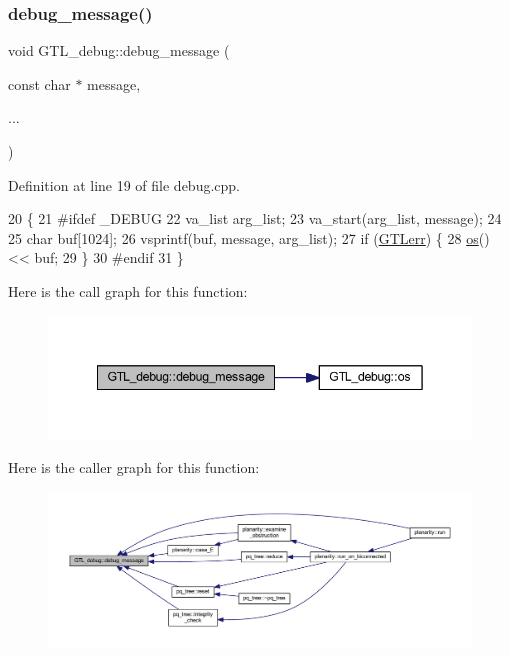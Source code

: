 \subsubsection{\texorpdfstring{debug\+\_\+message()}{debug\_message()}}
{\footnotesize\ttfamily void G\+T\+L\+\_\+debug\+::debug\+\_\+message (\begin{DoxyParamCaption}\item[{const char $\ast$}]{message,  }\item[{}]{... }\end{DoxyParamCaption})\hspace{0.3cm}{\ttfamily [static]}}



Definition at line 19 of file debug.\+cpp.


\begin{DoxyCode}
20 \{
21 \textcolor{preprocessor}{#ifdef \_DEBUG}
22     va\_list arg\_list;
23     va\_start(arg\_list, message);
24 
25     \textcolor{keywordtype}{char} buf[1024];
26     vsprintf(buf, message, arg\_list);
27     \textcolor{keywordflow}{if} (\mbox{\hyperlink{class_g_t_l__debug_a342e76e2d4f128a29548aae14172db45}{GTLerr}}) \{
28     \mbox{\hyperlink{class_g_t_l__debug_a40282dee89c7cd8ea6bd02856e6cd73f}{os}}() << buf;
29     \}
30 \textcolor{preprocessor}{#endif}
31 \}
\end{DoxyCode}
Here is the call graph for this function\+:\nopagebreak
\begin{figure}[H]
\begin{center}
\leavevmode
\includegraphics[width=342pt]{class_g_t_l__debug_aca4c2fb24203b5fba5e4ffa9c2fa263f_cgraph}
\end{center}
\end{figure}
Here is the caller graph for this function\+:\nopagebreak
\begin{figure}[H]
\begin{center}
\leavevmode
\includegraphics[width=350pt]{class_g_t_l__debug_aca4c2fb24203b5fba5e4ffa9c2fa263f_icgraph}
\end{center}
\end{figure}
\mbox{\label{class_g_t_l__debug_a119223c9000c1639d79d1a14a447c67a}} 
